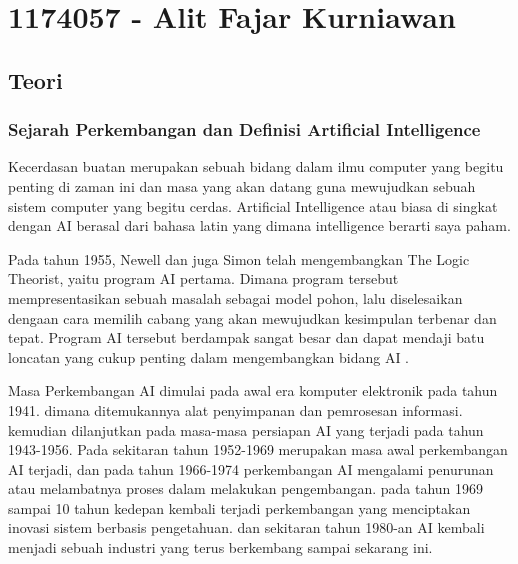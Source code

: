 \section{1174057 - Alit Fajar Kurniawan}
\subsection{Teori}
	\subsubsection {Sejarah Perkembangan dan Definisi Artiﬁcial Intelligence}
	Kecerdasan buatan merupakan sebuah bidang dalam ilmu computer yang begitu penting di zaman ini dan masa yang akan datang guna mewujudkan sebuah sistem computer yang begitu cerdas. Artiﬁcial Intelligence atau biasa di singkat dengan AI berasal dari bahasa latin yang dimana intelligence berarti saya paham. 
	\par Pada tahun 1955, Newell dan juga Simon telah mengembangkan The Logic Theorist, yaitu program AI pertama. Dimana program tersebut mempresentasikan sebuah masalah sebagai model pohon, lalu diselesaikan dengaan cara memilih cabang yang akan mewujudkan kesimpulan terbenar dan tepat. Program AI tersebut berdampak sangat besar dan dapat mendaji batu loncatan yang cukup penting dalam mengembangkan bidang AI \cite{baraja2008kecerdasan}.
	\par
	Masa Perkembangan AI dimulai pada awal era komputer elektronik pada tahun 1941. dimana ditemukannya alat penyimpanan dan pemrosesan informasi. kemudian dilanjutkan pada masa-masa persiapan AI yang terjadi pada tahun 1943-1956. Pada sekitaran tahun 1952-1969 merupakan masa awal perkembangan AI terjadi, dan pada tahun 1966-1974 perkembangan AI mengalami penurunan atau melambatnya proses dalam melakukan pengembangan. pada tahun 1969 sampai 10 tahun kedepan kembali terjadi perkembangan yang menciptakan inovasi sistem berbasis pengetahuan. dan sekitaran tahun 1980-an AI kembali menjadi sebuah industri yang terus berkembang sampai sekarang ini.


